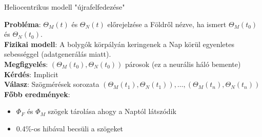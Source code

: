 \begin{frame}{Heliocentrikus modell "újrafelfedezése"}

    {\bf Probléma}: $\Theta_M(t)$ és $\Theta_N(t)$ előrejelzése a Földről nézve, ha ismert $\Theta_M(t_0)$ és $\Theta_N(t_0)$. \\
    {\bf Fizikai modell}: A bolygók körpályán keringenek a Nap körül egyenletes sebességgel (adatgenerálás miatt). \\
    {\bf Megfigyelés}: $(\Theta_M(t_0), \Theta_N(t_0))$ párosok (ez a neurális háló bemente) \\
    {\bf Kérdés}: Implicit \\
    {\bf Válasz}: Szögmérések sorozata $(\Theta_M(t_1), \Theta_N(t_1)), \dots, (\Theta_M(t_n), \Theta_N(t_n))$ \\
    {\bf Főbb eredmények}:
        \begin{itemize}
            \item $\Phi_F$ és $\Phi_M$ szögek tárolása ahogy a Naptól látszódik
            \item 0.4\%-os hibával becsüli a szögeket
        \end{itemize}
\end{frame}
